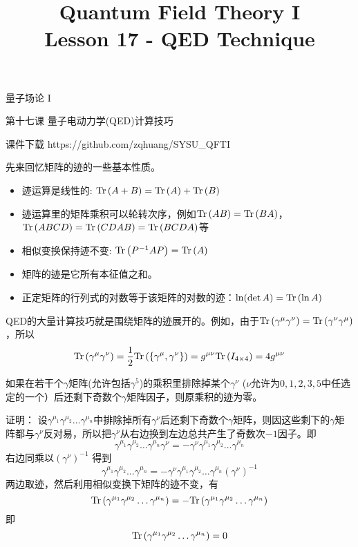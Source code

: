\documentclass[CJK]{beamer}
\title{Quantum Field Theory I \\ Lesson 17 - QED Technique}
\author{}
\date{}
\begin{document}
\begin{frame}
 
\begin{center}
\begin{Large}
\bch
量子场论 I 

{\vskip 0.3in}

第十七课 量子电动力学(QED)计算技巧

\ech
\end{Large}
\end{center}

\vskip 0.2in

\bch
课件下载
\ech
https://github.com/zqhuang/SYSU\_QFTI

\end{frame}

\begin{frame}
\bch
{\small
先来回忆矩阵的迹的一些基本性质。
\begin{itemize}
\item{迹运算是线性的: $\mathrm{Tr}\left(A+B\right) = \mathrm{Tr}\left(A\right) + \mathrm{Tr}\left(B\right)$}
\item{迹运算里的矩阵乘积可以轮转次序，例如$\mathrm{Tr}\left(AB\right) =\mathrm{Tr}\left(BA\right)$，$\mathrm{Tr}\left(ABCD\right) = \mathrm{Tr}\left(CDAB\right) = \mathrm{Tr}\left(BCDA\right)$等}
\item{相似变换保持迹不变: $\mathrm{Tr}\left(P^{-1}AP\right) = \mathrm{Tr}\left(A\right)$}
\item{矩阵的迹是它所有本征值之和。}
\item{正定矩阵的行列式的对数等于该矩阵的对数的迹：$\ln(\det{A}) = \mathrm{Tr}\left(\ln A\right)$ }
\end{itemize}

\skipline
QED的大量计算技巧就是围绕矩阵的迹展开的。例如，由于$\mathrm{Tr}\left(\gamma^\mu\gamma^\nu\right) = \mathrm{Tr}\left(\gamma^\nu\gamma^\mu\right)$，所以
$$\mathrm{Tr}\left(\gamma^\mu\gamma^\nu\right) = \frac{1}{2}\mathrm{Tr}\left(\{\gamma^\mu,\gamma^\nu\}\right) = g^{\mu\nu} \mathrm{Tr}\left(I_{4\times 4}\right)  = 4 g^{\mu\nu}$$

}
\ech
\end{frame}


\begin{frame}
\bch
如果在若干个$\gamma$矩阵(允许包括$\gamma^5$)的乘积里排除掉某个$\gamma^\nu$ ($\nu$允许为$0,1,2,3,5$中任选定的一个）后还剩下奇数个$\gamma$矩阵因子，则原乘积的迹为零。
\skipline

{\scriptsize
证明： 设$\gamma^{\mu_1}\gamma^{\mu_2}\ldots\gamma^{\mu_n}$中排除掉所有$\gamma^\nu$后还剩下奇数个$\gamma$矩阵，则因这些剩下的$\gamma$矩阵都与$\gamma^\nu$反对易，所以把$\gamma^\nu$从右边换到左边总共产生了奇数次$-1$因子。即
$$\gamma^{\mu_1}\gamma^{\mu_2}\ldots\gamma^{\mu_n} \gamma^\nu = -\gamma^\nu\gamma^{\mu_1}\gamma^{\mu_2}\ldots\gamma^{\mu_n} $$
右边同乘以$(\gamma^\nu)^{-1}$ 得到
$$\gamma^{\mu_1}\gamma^{\mu_2}\ldots\gamma^{\mu_n} = -\gamma^\nu\gamma^{\mu_1}\gamma^{\mu_2}\ldots\gamma^{\mu_n} (\gamma^\nu)^{-1}$$
两边取迹，然后利用相似变换下矩阵的迹不变，有
$$\mathrm{Tr}\left(\gamma^{\mu_1}\gamma^{\mu_2}\ldots\gamma^{\mu_n} \right) = - \mathrm{Tr}\left(\gamma^{\mu_1}\gamma^{\mu_2}\ldots\gamma^{\mu_n} \right)$$
即
$$\mathrm{Tr}\left(\gamma^{\mu_1}\gamma^{\mu_2}\ldots\gamma^{\mu_n} \right) = 0$$

}

\ech
\end{frame}
\end{document}
